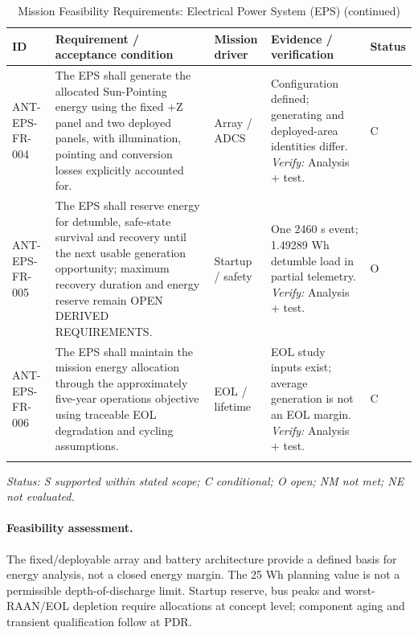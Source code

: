 \begin{table}[H]\centering\small\setlength{\tabcolsep}{3pt}
\ContinuedFloat\captionsetup{list=no}
\caption{Mission Feasibility Requirements: Electrical Power System (EPS) (continued)}
\begin{tabular}{@{}
>{\RaggedRight\arraybackslash}p{}
>{\RaggedRight\arraybackslash}p{}
>{\RaggedRight\arraybackslash}p{}
>{\RaggedRight\arraybackslash}p{}
>{\RaggedRight\arraybackslash}p{}
@{}}
\toprule ID & Requirement / acceptance condition & Mission driver & Evidence / verification & Status\\\midrule
{}\label{req:ANT-EPS-FR-004}\mbox{ANT-EPS-}\newline\mbox{FR-004} & The EPS shall generate the allocated Sun-Pointing energy using the fixed +Z panel and two deployed panels, with illumination, pointing and conversion losses explicitly accounted for. & Array / ADCS & Configuration defined; generating and deployed-area identities differ. \emph{Verify:} Analysis + test. & C\\
\addlinespace[3pt]
\label{req:ANT-EPS-FR-005}\mbox{ANT-EPS-}\newline\mbox{FR-005} & The EPS shall reserve energy for detumble, safe-state survival and recovery until the next usable generation opportunity; maximum recovery duration and energy reserve remain OPEN DERIVED REQUIREMENTS. & Startup / safety & One 2460 s event; 1.49289 Wh detumble load in partial telemetry. \emph{Verify:} Analysis + test. & O\\
\addlinespace[3pt]
\label{req:ANT-EPS-FR-006}\mbox{ANT-EPS-}\newline\mbox{FR-006} & The EPS shall maintain the mission energy allocation through the approximately five-year operations objective using traceable EOL degradation and cycling assumptions. & EOL / lifetime & EOL study inputs exist; average generation is not an EOL margin. \emph{Verify:} Analysis + test. & C\\
\addlinespace[3pt]
\bottomrule
\end{tabular}
\end{table}
\textit{Status: S supported within stated scope; C conditional; O open; NM not met; NE not evaluated.}
\paragraph{Feasibility assessment.} The fixed/deployable array and battery architecture provide a defined basis for energy analysis, not a closed energy margin. The 25 Wh planning value is not a permissible depth-of-discharge limit. Startup reserve, bus peaks and worst-RAAN/EOL depletion require allocations at concept level; component aging and transient qualification follow at PDR.
